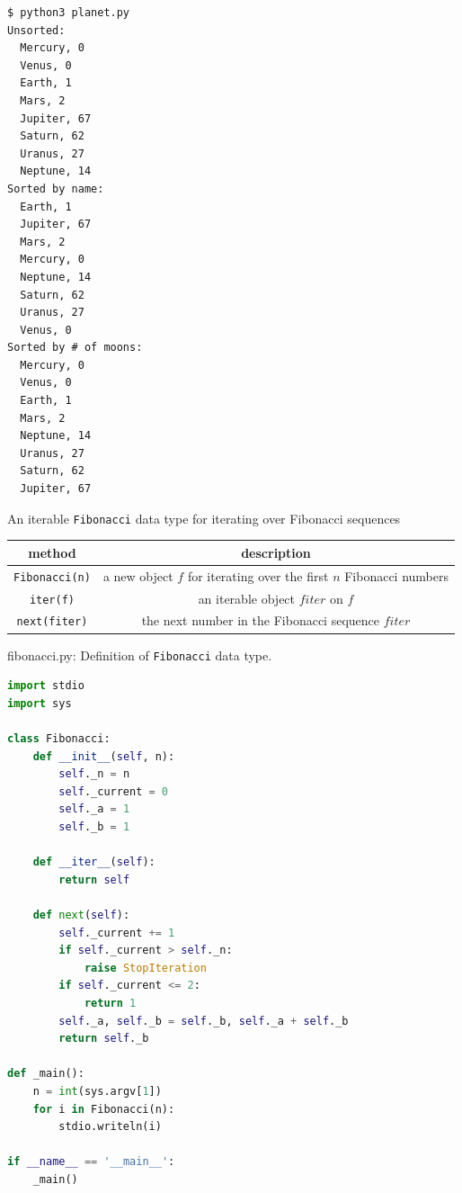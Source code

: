 \documentclass[8pt,a4paper,compress]{beamer}
\begin{document}
\begin{frame}[fragile]
\pause

\begin{lstlisting}[language={},style=focusin]
$ python3 planet.py 
Unsorted:
  Mercury, 0
  Venus, 0
  Earth, 1
  Mars, 2
  Jupiter, 67
  Saturn, 62
  Uranus, 27
  Neptune, 14
Sorted by name:
  Earth, 1
  Jupiter, 67
  Mars, 2
  Mercury, 0
  Neptune, 14
  Saturn, 62
  Uranus, 27
  Venus, 0
Sorted by # of moons:
  Mercury, 0
  Venus, 0
  Earth, 1
  Mars, 2
  Neptune, 14
  Uranus, 27
  Saturn, 62
  Jupiter, 67
\end{lstlisting}
\end{frame}

\begin{frame}[fragile]
\pause

An iterable \lstinline{Fibonacci} data type for iterating over Fibonacci sequences
\begin{center}
\begin{tabular}{cc}
method & description \\ \hline
\lstinline$Fibonacci(n)$ & a new object $f$ for iterating over the first $n$ Fibonacci numbers \\
\lstinline$iter(f)$ & an iterable object $fiter$ on $f$ \\
\lstinline$next(fiter)$ & the next number in the Fibonacci sequence $fiter$
\end{tabular} 
\end{center}
\end{frame}

\begin{frame}[fragile]
\pause

\begin{framed}
\tiny fibonacci.py: Definition of \lstinline{Fibonacci} data type.
\end{framed}

\begin{lstlisting}[language=Python,style=focusin]
import stdio
import sys

class Fibonacci:
    def __init__(self, n):
        self._n = n
        self._current = 0
        self._a = 1
        self._b = 1

    def __iter__(self):
        return self
        
    def next(self):
        self._current += 1
        if self._current > self._n:
            raise StopIteration
        if self._current <= 2:
            return 1
        self._a, self._b = self._b, self._a + self._b
        return self._b

def _main():
    n = int(sys.argv[1])
    for i in Fibonacci(n):
        stdio.writeln(i)

if __name__ == '__main__':
    _main()
\end{lstlisting}
\end{frame}
\end{document}
